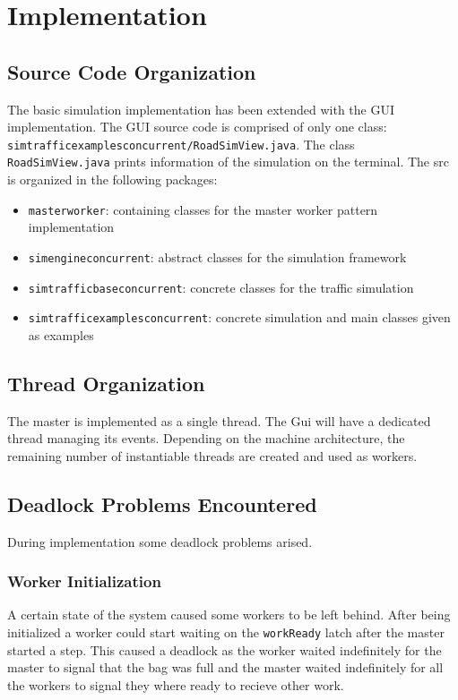\documentclass[12pt, a4paper]{report}
\begin{document}
\chapter{Implementation}

\section{Source Code Organization}
The basic simulation implementation has been extended with the GUI implementation.
%
The GUI source code is comprised of only one class:\\ \texttt{simtrafficexamplesconcurrent/RoadSimView.java}.
%
The class \texttt{RoadSimView.java} prints information of the simulation on the terminal.
%
The src is organized in the following packages:
\begin{itemize}
    \item \texttt{masterworker}: containing classes for the master worker pattern implementation
    \item \texttt{simengineconcurrent}: abstract classes for the simulation framework
    \item \texttt{simtrafficbaseconcurrent}: concrete classes for the traffic simulation
    \item \texttt{simtrafficexamplesconcurrent}: concrete simulation and main classes given as examples
\end{itemize}

\section{Thread Organization} %
The master is implemented as a single thread. The Gui will have a dedicated thread
 managing its events. Depending on the machine architecture, the remaining number
 of instantiable threads are created and used as workers.

\section{Deadlock Problems Encountered}
During implementation some deadlock problems arised.

\subsection{Worker Initialization}
A certain state of the system caused some workers to be left behind.
 After being initialized a worker could start waiting on the \texttt{workReady} latch after
 the master started a step. This caused a deadlock as the worker waited indefinitely
 for the master to signal that the bag was full and the master waited indefinitely for
 all the workers to signal they where ready to recieve other work.
\end{document}
